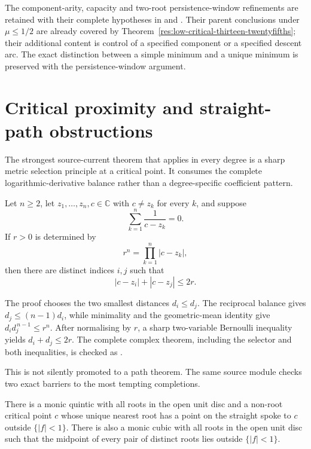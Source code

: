 \documentclass[11pt]{article}
\newcommand{\pdecl}[1]{\emph{\leanlabel{#1}}}
\begin{document}
The component-arity, capacity and two-root persistence-window refinements
are retained with their complete hypotheses in
 and
.
Their parent conclusions under $\mu\le1/2$ are already covered by
Theorem~\ref{res:low-critical-thirteen-twentyfifths}; their additional content
is control of a specified component or a specified descent arc.
The exact distinction between a simple minimum and a unique minimum is
preserved with the persistence-window argument.

\section{Critical proximity and straight-path obstructions}
\label{sec:critical-proximity}

The strongest source-current theorem that applies in every degree is a sharp
metric selection principle at a critical point.  It consumes the complete
logarithmic-derivative balance rather than a degree-specific coefficient
pattern.

\begin{theorem}
\label{res:critical-proximity}
Let $n\ge2$, let $z_1,\ldots,z_n,c\in\mathbb C$ with $c\ne z_k$ for every
$k$, and suppose
\[
  \sum_{k=1}^n\frac1{c-z_k}=0.
\]
If $r>0$ is determined by
\[
  r^n=\prod_{k=1}^n|c-z_k|,
\]
then there are distinct indices $i,j$ such that
\[
  |c-z_i|+|c-z_j|\le2r.
\]
\end{theorem}

\noindent The proof chooses the two smallest distances $d_i\le d_j$.
The reciprocal balance gives $d_j\le(n-1)d_i$, while minimality and the
geometric-mean identity give
$d_i d_j^{\,n-1}\le r^n$.  After normalising by $r$, a sharp two-variable
Bernoulli inequality yields $d_i+d_j\le2r$.  The complete complex theorem,
including the selector and both inequalities, is checked as
\pdecl{exists_two_roots_dist_sum_le_two_mul_geomMean}.

This is not silently promoted to a path theorem.  The same source module
checks two exact barriers to the most tempting completions.

\begin{proposition}
\label{res:straight-no-go}
There is a monic quintic with all roots in the open unit disc and a non-root
critical point $c$ whose unique nearest root has a point on the straight spoke
to $c$ outside $\{|f|<1\}$.  There is also a monic cubic with all roots in the
open unit disc such that the midpoint of every pair of distinct roots lies
outside $\{|f|<1\}$.
\end{proposition}
\end{document}
